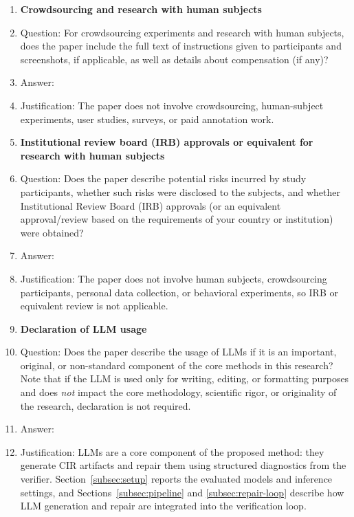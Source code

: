 \begin{enumerate}
\item {\bf Crowdsourcing and research with human subjects}
    \item[] Question: For crowdsourcing experiments and research with human subjects, does the paper include the full text of instructions given to participants and screenshots, if applicable, as well as details about compensation (if any)? 
    \item[] Answer: \answerNA{}
    \item[] Justification: The paper does not involve crowdsourcing, human-subject experiments, user studies, surveys, or paid annotation work.

\item {\bf Institutional review board (IRB) approvals or equivalent for research with human subjects}
    \item[] Question: Does the paper describe potential risks incurred by study participants, whether such risks were disclosed to the subjects, and whether Institutional Review Board (IRB) approvals (or an equivalent approval/review based on the requirements of your country or institution) were obtained?
    \item[] Answer: \answerNA{}
    \item[] Justification: The paper does not involve human subjects, crowdsourcing participants, personal data collection, or behavioral experiments, so IRB or equivalent review is not applicable.

\item {\bf Declaration of LLM usage}
    \item[] Question: Does the paper describe the usage of LLMs if it is an important, original, or non-standard component of the core methods in this research? Note that if the LLM is used only for writing, editing, or formatting purposes and does \emph{not} impact the core methodology, scientific rigor, or originality of the research, declaration is not required.
    \item[] Answer: \answerYes{}
    \item[] Justification: LLMs are a core component of the proposed method: they generate CIR artifacts and repair them using structured diagnostics from the verifier. Section~\ref{subsec:setup} reports the evaluated models and inference settings, and Sections~\ref{subsec:pipeline} and \ref{subsec:repair-loop} describe how LLM generation and repair are integrated into the verification loop.

\end{enumerate}
